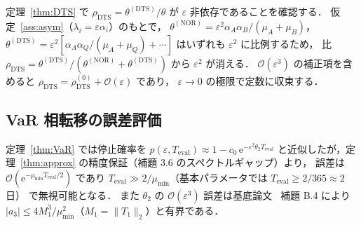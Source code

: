 \documentclass[12pt,a4paper]{article}
\theoremstyle{plain}
\theoremstyle{definition}
\theoremstyle{remark}
\newcommand{\calO}{\mathcal{O}}        %
\newcommand{\eps}{\varepsilon}         %
\newcommand{\e}{\mathrm{e}}            %
\newcommand{\thetaNOR}{\theta^{(\mathrm{NOR})}}
\newcommand{\thetaDTS}{\theta^{(\mathrm{DTS})}}
\newcommand{\rhoDTS}{\rho_{\mathrm{DTS}}}
\begin{document}
定理~\ref{thm:DTS} で $\rhoDTS = \thetaDTS/\theta$ が $\eps$ 非依存であることを確認する．
仮定~\ref{ass:asym}（$\lambda_i = \eps\alpha_i$）のもとで，
$\thetaNOR = \eps^2\alpha_A\alpha_B/(\mu_A+\mu_B)$，
$\thetaDTS = \eps^2[\alpha_A\alpha_Q/(\mu_A+\mu_Q)+\cdots]$
はいずれも $\eps^2$ に比例するため，
比 $\rhoDTS = \thetaDTS/(\thetaNOR+\thetaDTS)$ から $\eps^2$ が消える．
$\calO(\eps^3)$ の補正項を含めると $\rhoDTS = \rhoDTS^{(0)} + \calO(\eps)$ であり，
$\eps\to 0$ の極限で定数に収束する．

\subsection{VaR 相転移の誤差評価}\label{app:VaR_error}

定理~\ref{thm:VaR} では停止確率を
$p(\eps,T_{\mathrm{eval}}) \approx 1-c_0\,\e^{-\eps^2\theta_2 T_{\mathrm{eval}}}$
と近似したが，定理~\ref{thm:approx} の精度保証（補題 3.6 のスペクトルギャップ）より，
誤差は $\calO(\e^{-\mu_{\min}T_{\mathrm{eval}}/2})$ であり
$T_{\mathrm{eval}} \gg 2/\mu_{\min}$（基本パラメータでは $T_{\mathrm{eval}}\ge 2/365 \approx 2$ 日）
で無視可能となる．
また $\theta_2$ の $\calO(\eps^3)$ 誤差は基底論文~\cite{habase:v7}
補題 B.4 により $|a_3|\le 4M_1^3/\mu_{\min}^2$（$M_1=\|T_1\|_2$）と有界である．
\end{document}
